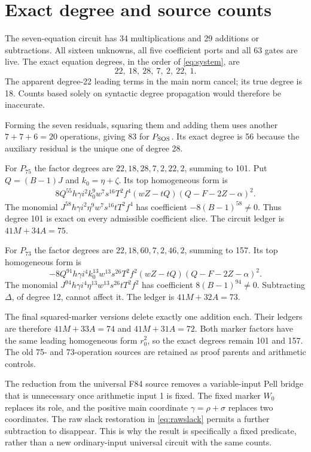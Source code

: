 \documentclass[11pt,a4paper]{article}
\theoremstyle{definition}\newtheorem{definition}[theorem]{Definition}
\begin{document}
\section{Exact degree and source counts}\label{sec:counts}
The seven-equation circuit has 34 multiplications and 29 additions or
subtractions. All sixteen unknowns, all five coefficient ports and all
63 gates are live. The exact equation degrees, in the order of
\eqref{eq:system}, are
\[
 22,\ 18,\ 28,\ 7,\ 2,\ 22,\ 1.
\]
The apparent degree-22 leading terms in the main norm cancel; its true
degree is 18. Counts based solely on syntactic degree propagation would
therefore be inaccurate.

Forming the seven residuals, squaring them and adding them uses another
$7+7+6=20$ operations, giving 83 for $P_{\rm SOS}$. Its exact degree
is 56 because the auxiliary residual is the unique one of degree 28.

For $P_{75}$ the factor degrees are
$22,18,28,7,2,22,2$, summing to 101.
Put $Q=(B-1)J$ and $k_0=\eta+\zeta$. Its top homogeneous form is
\begin{align*}
 8Q^{55}h\gamma i^2k_0^9w^7s^{16}T^2f^4
 (wZ-tQ)(Q-F-2Z-\alpha)^2.
\end{align*}
The monomial
$J^{58}h\gamma i^2\eta^9w^7s^{16}tT^2f^4$
has coefficient $-8(B-1)^{58}\ne0$. Thus degree 101 is exact on every
admissible coefficient slice. The circuit ledger is $41M+34A=75$.

For $P_{73}$ the factor degrees are
$22,18,60,7,2,46,2$, summing to 157. Its top homogeneous form is
\[
 -8Q^{91}h\gamma i^4k_0^{13}w^{13}s^{26}T^2f^2
 (wZ-tQ)(Q-F-2Z-\alpha)^2.
\]
The monomial
$J^{94}h\gamma i^4\eta^{13}w^{13}s^{26}tT^2f^2$
has coefficient $8(B-1)^{94}\ne0$. Subtracting $\Delta$, of degree
12, cannot affect it. The ledger is $41M+32A=73$.

The final squared-marker versions delete exactly one addition each.
Their ledgers are therefore $41M+33A=74$ and $41M+31A=72$.
Both marker factors have the same leading homogeneous form $r_0^2$,
so the exact degrees remain 101 and 157. The old 75- and 73-operation
sources are retained as proof parents and arithmetic controls.

The reduction from the universal F84 source removes a variable-input
Pell bridge that is unnecessary once arithmetic input 1 is fixed.
The fixed marker $W_0$ replaces its role, and the positive main
coordinate $\gamma=\rho+\sigma$ replaces two coordinates.
The raw slack restoration in \eqref{eq:rawslack} permits a further
subtraction to disappear. This is why the result is specifically a
fixed predicate, rather than a new ordinary-input universal circuit
with the same counts.
\end{document}
